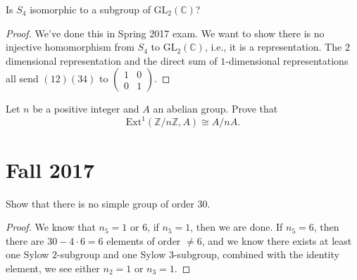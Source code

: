\documentclass[openany]{book}
\newcommand{\C}{\mathbb{C}}
\begin{document}
\begin{prob}
    Is \(S_4\) isomorphic to a subgroup of \(\text{GL}_2(\mathbb{C})\)?
\end{prob}
\begin{proof}
    We've done this in Spring 2017 exam. We want to show there is no injective homomorphism from $S_4$ to $\text{GL}_2(\C)$, i.e., it is a representation. The $2$ dimensional representation and the direct sum of $1$-dimensional representations all send $(12)(34)$ to $\begin{pmatrix}
        1&0\\
        0&1
    \end{pmatrix}$.
\end{proof}




\begin{prob}
    Let \(n\) be a positive integer and \(A\) an abelian group. Prove that
    \[\text{Ext}^1(\mathbb{Z}/n\mathbb{Z}, A) \cong A/nA.\]
\end{prob}





\chapter{Fall 2017}


\begin{prob}
    Show that there is no simple group of order 30.
\end{prob}
\begin{proof}
    We know that $n_5=1$ or $6$, if $n_5=1$, then we are done. If $n_5=6$, then there are $30-4\cdot 6=6$ elements of order $\neq 6$, and we know there exists at least one Sylow $2$-subgroup and one Sylow $3$-subgroup, combined with the identity element, we see either $n_2=1$ or $n_3=1$. 
\end{proof}
\end{document}
